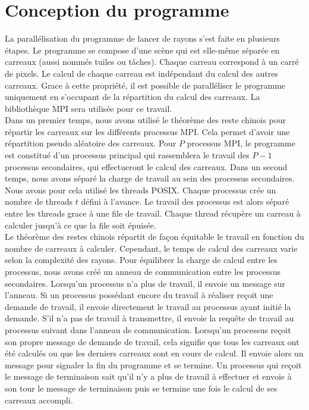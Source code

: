 \section{Conception du programme} %
\label{sec:conception}

La parallélisation du programme de lancer de rayons s'est faite en plusieurs étapes. Le programme se compose d'une scène qui est elle-même séparée en carreaux (aussi nommés tuiles ou tâches). Chaque carreau correspond à un carré de pixels. Le calcul de chaque carreau est indépendant du calcul des autres carreaux. Grace à cette propriété, il est possible de paralléliser le programme uniquement en s'occupant de la répartition du calcul des carreaux. La bibliothèque MPI sera utilisée pour ce travail.\\

Dans un premier temps, nous avons utilisé le théorème des reste chinois pour répartir les carreaux sur les différents processus MPI. Cela permet d'avoir une répartition pseudo aléatoire des carreaux. Pour $P$ processus MPI, le programme est constitué d'un processus principal qui rassemblera le travail des $P-1$ processus secondaires, qui effectueront le calcul des carreaux. Dans un second temps, nous avons séparé la charge de travail au sein des processus secondaires. Nous avons pour cela utilisé les threads POSIX. Chaque processus crée un nombre de threads $t$ défini à l'avance. Le travail des processus est alors séparé entre les threads grace à une file de travail. Chaque thread récupère un carreau à calculer jusqu'à ce que la file soit épuisée.\\

Le théorème des restes chinois répartit de façon équitable le travail en fonction du nombre de carreaux à calculer. Cependant, le temps de calcul des carreaux varie selon la complexité des rayons. Pour équilibrer la charge de calcul entre les processus, nous avons créé un anneau de communication entre les processus secondaires. Lorsqu'un processus n'a plus de travail, il envoie un message sur l'anneau. Si un processus possédant encore du travail à réaliser reçoit une demande de travail, il envoie directement le travail au processus ayant initié la demande. S'il n'a pas de travail à transmettre, il envoie la requête de travail au processus suivant dans l'anneau de communication. Lorsqu'un processus reçoit son propre message de demande de travail, cela signifie que tous les carreaux ont été calculés ou que les derniers carreaux sont en cours de calcul. Il envoie alors un message pour signaler la fin du programme et se termine. Un processus qui reçoit le message de terminaison sait qu'il n'y a plus de travail à effectuer et envoie à son tour le message de terminaison puis se termine une fois le calcul de ses carreaux accompli.

